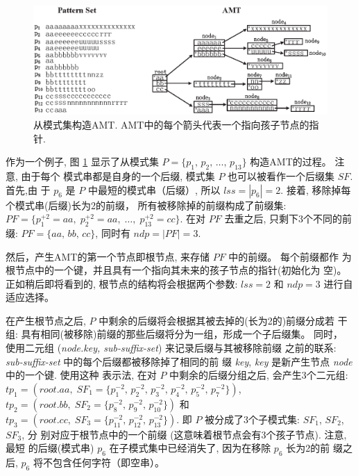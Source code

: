 \begin{figure}[!h]
  \centering
  \includegraphics[width=\textwidth]{figures/2_MPM/AMT}
  \caption{从模式集构造AMT. AMT中的每个箭头代表一个指向孩子节点的指针.}
  \label{fig:AMT}
\end{figure}

作为一个例子, 图 \ref{fig:AMT} 显示了从模式集
$P = \{p_1,\, p_2,\, \dots,\, p_{13}\}$ 构造AMT的过程。 注意, 由于每个
模式串都是自身的一个后缀, 模式集 $P$ 也可以被看作一个后缀集 $SF$. 首先,由
于 $p_6$ 是 $P$ 中最短的模式串（后缀）, 所以 $lss = |p_6| = 2$. 接着,
移除掉每个模式串(后缀)长为2的前缀， 所有被移除掉的前缀构成了前缀集:
$PF = \{p_1^{+2} = aa,\; p_2^{+2} = aa,\; \dots,\; p_{13}^{+2} =
cc\}$.  在对 $PF$ 去重之后, 只剩下3个不同的前缀: $PF = \{aa,\, bb,\,
cc\}$, 同时有 $ndp = |PF| = 3$.

然后，产生AMT的第一个节点即根节点, 来存储 $PF$ 中的前缀。 每个前缀都作
为根节点中的一个键，并且具有一个指向其未来的孩子节点的指针(初始化为
空)。 正如稍后即将看到的, 根节点的结构将会根据两个参数:
$lss=2$ 和 $ndp=3$ 进行自适应选择。

在产生根节点之后, $P$ 中剩余的后缀将会根据其被去掉的(长为2的)前缀分成若
干组: 具有相同(被移除)前缀的那些后缀将分为一组，形成一个子后缀集。 同时，
使用二元组 (\emph{node.key,\; sub-suffix-set}) 来记录后缀与其被移除前缀
之前的联系: \emph{sub-suffix-set} 中的每个后缀都被移除掉了相同的前
缀 \emph{key}, \emph{key} 是新产生节点 \emph{node} 中的一个键. 使用这种
表示法, 在对 $P$ 中剩余的后缀分组之后, 会产生3个二元组:
$tp_1 = (root.aa,\; SF_1=\{p_1^{-2},\, p_2^{-2},\, p_3^{-2},\,
p_4^{-2},\, p_5^{-2},\, p_7^{-2}\})$,\,
$tp_2 = (root.bb,\; SF_2=\{p_8^{-2},\, p_9^{-2},\,
p_{10}^{-2}\})$ 和
$tp_3 = (root.cc,\; SF_3=\{p_{11}^{-2},\, p_{12}^{-2},\,
p_{13}^{-2}\})$. 即 $P$ 被分成了3个子模式集: $SF_1$, $SF_2$, $SF_3$, 分
别对应于根节点中的一个前缀 (这意味着根节点会有3个孩子节点). 注意, 最短
的后缀(模式串) $p_6$ 在子模式集中已经消失了, 因为在移除 $p_6$ 长为2的前
缀之后, $p_6$ 将不包含任何字符（即空串）。

